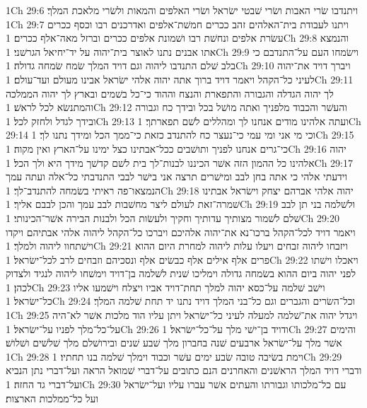 1Ch 29:6  ויתנדבו שׂרי האבות ושׂרי שׁבטי ישׂראל ושׂרי האלפים והמאות ולשׂרי מלאכת המלך׃
1Ch 29:7  ויתנו לעבודת בית־האלהים זהב ככרים חמשׁת־אלפים ואדרכנים רבו וכסף ככרים עשׂרת אלפים ונחשׁת רבו ושׁמונת אלפים ככרים וברזל מאה־אלף ככרים׃
1Ch 29:8  והנמצא אתו אבנים נתנו לאוצר בית־יהוה על יד־יחיאל הגרשׁני׃
1Ch 29:9  וישׂמחו העם על־התנדבם כי בלב שׁלם התנדבו ליהוה וגם דויד המלך שׂמח שׂמחה גדולה׃
1Ch 29:10  ויברך דויד את־יהוה לעיני כל־הקהל ויאמר דויד ברוך אתה יהוה אלהי ישׂראל אבינו מעולם ועד־עולם׃
1Ch 29:11  לך יהוה הגדלה והגבורה והתפארת והנצח וההוד כי־כל בשׁמים ובארץ לך יהוה הממלכה והמתנשׂא לכל לראשׁ׃
1Ch 29:12  והעשׁר והכבוד מלפניך ואתה מושׁל בכל ובידך כח וגבורה ובידך לגדל ולחזק לכל׃
1Ch 29:13  ועתה אלהינו מודים אנחנו לך ומהללים לשׁם תפארתך׃
1Ch 29:14  וכי מי אני ומי עמי כי־נעצר כח להתנדב כזאת כי־ממך הכל ומידך נתנו לך׃
1Ch 29:15  כי־גרים אנחנו לפניך ותושׁבים ככל־אבתינו כצל ימינו על־הארץ ואין מקוה׃
1Ch 29:16  יהוה אלהינו כל ההמון הזה אשׁר הכיננו לבנות־לך בית לשׁם קדשׁך מידך היא ולך הכל׃
1Ch 29:17  וידעתי אלהי כי אתה בחן לבב ומישׁרים תרצה אני בישׁר לבבי התנדבתי כל־אלה ועתה עמך הנמצאו־פה ראיתי בשׂמחה להתנדב־לך׃
1Ch 29:18  יהוה אלהי אברהם יצחק וישׂראל אבתינו שׁמרה־זאת לעולם ליצר מחשׁבות לבב עמך והכן לבבם אליך׃
1Ch 29:19  ולשׁלמה בני תן לבב שׁלם לשׁמור מצותיך עדותיך וחקיך ולעשׂות הכל ולבנות הבירה אשׁר־הכינותי׃
1Ch 29:20  ויאמר דויד לכל־הקהל ברכו־נא את־יהוה אלהיכם ויברכו כל־הקהל ליהוה אלהי אבתיהם ויקדו וישׁתחוו ליהוה ולמלך׃
1Ch 29:21  ויזבחו ליהוה זבחים ויעלו עלות ליהוה למחרת היום ההוא פרים אלף אילים אלף כבשׂים אלף ונסכיהם וזבחים לרב לכל־ישׂראל׃
1Ch 29:22  ויאכלו וישׁתו לפני יהוה ביום ההוא בשׂמחה גדולה וימליכו שׁנית לשׁלמה בן־דויד וימשׁחו ליהוה לנגיד ולצדוק לכהן׃
1Ch 29:23  וישׁב שׁלמה על־כסא יהוה למלך תחת־דויד אביו ויצלח וישׁמעו אליו כל־ישׂראל׃
1Ch 29:24  וכל־השׂרים והגברים וגם כל־בני המלך דויד נתנו יד תחת שׁלמה המלך׃
1Ch 29:25  ויגדל יהוה את־שׁלמה למעלה לעיני כל־ישׂראל ויתן עליו הוד מלכות אשׁר לא־היה על־כל־מלך לפניו על־ישׂראל׃
1Ch 29:26  ודויד בן־ישׁי מלך על־כל־ישׂראל׃
1Ch 29:27  והימים אשׁר מלך על־ישׂראל ארבעים שׁנה בחברון מלך שׁבע שׁנים ובירושׁלם מלך שׁלשׁים ושׁלושׁ׃
1Ch 29:28  וימת בשׂיבה טובה שׂבע ימים עשׁר וכבוד וימלך שׁלמה בנו תחתיו׃
1Ch 29:29  ודברי דויד המלך הראשׁנים והאחרנים הנם כתובים על־דברי שׁמואל הראה ועל־דברי נתן הנביא ועל־דברי גד החזה׃
1Ch 29:30  עם כל־מלכותו וגבורתו והעתים אשׁר עברו עליו ועל־ישׂראל ועל כל־ממלכות הארצות׃


